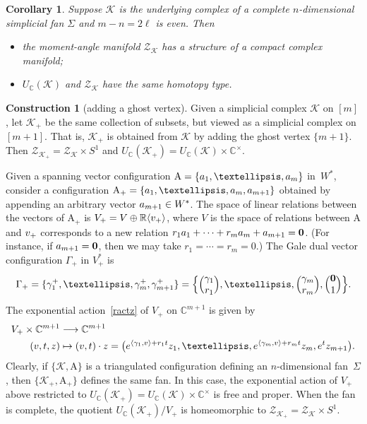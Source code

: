 \documentclass[a4paper]{amsart}
\newtheorem{corollary}[theorem]{Corollary}
\theoremstyle{definition}
\newtheorem{construction}[theorem]{Construction}
\theoremstyle{remark}
\numberwithin{equation}{section}
\def\R{\mathbb R}
\def\C{\mathbb C}
\def\R{\mathbb R}
\def\sK{\mathcal K}
\newcommand{\mb}[1]{{\textbf {\textit#1}}}
\newcommand{\zk}{\mathcal Z_{\mathcal K}}
\newcommand{\<}{\langle}
\renewcommand{\>}{\rangle}
\begin{document}
\begin{corollary}\label{zkfancplx}
Suppose $\sK$ is the underlying complex of a complete $n$-dimensional simplicial fan $\Sigma$ and $m-n=2\ell$ is even. Then
\begin{itemize}
\item[(1)] the moment-angle manifold $\zk$ has a structure of a compact complex manifold;
\item[(2)] $U_\C(\sK)$ and $\zk$ have the same homotopy type.
\end{itemize}
\end{corollary}

\begin{construction}[adding a ghost vertex]\label{addgv}
Given a simplicial complex $\sK$ on $[m]$, let $\sK_+$ be the same collection of subsets, but viewed as a simplicial complex on $[m+1]$. That is, $\sK_+$ is obtained from $\sK$ by adding the ghost vertex $\{m+1\}$. Then $\mathcal Z_{\sK_+}=\zk\times S^1$ and $U_\C(\sK_+)=U_\C(\sK)\times\C^\times$. 

Given a spanning vector configuration $\mathrm A=\{\mb a_1,\ldots,\mb a_m\}$ in~$W^*$, consider a configuration $\mathrm A_+=\{\mb a_1,\ldots,\mb a_m,\mb a_{m+1}\}$ obtained by appending an arbitrary vector $\mb a_{m+1}\in W^*$. The space of linear relations between the vectors of $\mathrm A_+$ is $V_+=V\oplus\R\langle\mb v_+\rangle$, where $V$ is the space of relations between $\mathrm A$ and $\mb v_+$ corresponds to a new relation $r_1\mb a_1+\cdots+r_m\mb a_m+\mb a_{m+1}=\bf0$. (For instance, if $\mb a_{m+1}=\bf0$, then we may take $r_1=\cdots=r_m=0$.) The Gale dual vector configuration $\Gamma_+$ in $V_+^*$ is
\[
  \Gamma_+=\{\gamma^+_1,\ldots,\gamma^+_m,\gamma^+_{m+1}\}=
  \Bigl\{\Bigl(\begin{matrix}\gamma_1\\r_1\end{matrix}\Bigr),\ldots,
  \Bigl(\begin{matrix}\gamma_m\\r_m\end{matrix}\Bigr),
  \Bigl(\begin{matrix}\bf0\\1\end{matrix}\Bigr)\Bigr\}.
\]
The exponential action~\eqref{ractz} of $V_+$ on $\C^{m+1}$ is given by
\[
\begin{aligned}
  V_+\times\C^{m+1}&\longrightarrow\C^{m+1}\\
  (\mb v,t,\mb z)&\mapsto (\mb v,t)\cdot\mb z=\bigl(e^{\langle\gamma_1,\mb
  v\rangle+r_1t}z_1,\ldots,
  e^{\langle\gamma_m,\mb v\rangle+r_mt}z_m,e^tz_{m+1}\bigr).
\end{aligned}
\]
Clearly, if $\{\sK,\mathrm A\}$ is a triangulated configuration defining an $n$-dimensional fan~$\Sigma$, then $\{\sK_+,\mathrm A_+\}$ defines the same fan. In this case, the exponential action of $V_+$ above restricted to $U_\C(\sK_+)=U_\C(\sK)\times\C^\times$ is free and proper. When the fan is complete, the quotient $U_\C(\sK_+)/V_+$ is homeomorphic to  $\mathcal Z_{\sK_+}=\zk\times S^1$.



\end{construction}
\end{document}
